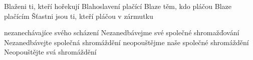         




        {Blaženi ti, kteří hořekují}
        {Blahoslavení plačící}
        {Blaze těm, kdo pláčou}
        {Blaze plačícím}
        {Šťastni jsou ti, kteří pláčou v zármutku}









      {nezanechávajíce svého scházení} %
      {Nezanedbávejme své společné shromažďování} %
      {Nezanedbávejte společná shromáždění} %
      {neopouštějme naše společné shromáždění} %
      {Neopouštějte svá shromáždění} %
      



\endinput



\endinput

\vdef   {}  %
        {}  %
        {}  %
        {}  %
        {}  %
        {}  %
        
























